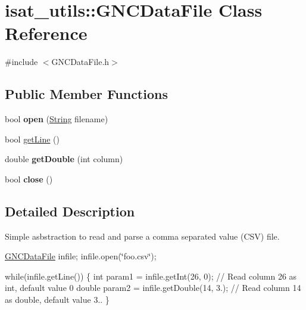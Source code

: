 \hypertarget{classisat__utils_1_1_g_n_c_data_file}{}\section{isat\+\_\+utils\+:\+:G\+N\+C\+Data\+File Class Reference}
\label{classisat__utils_1_1_g_n_c_data_file}


{\ttfamily \#include $<$G\+N\+C\+Data\+File.\+h$>$}

\subsection*{Public Member Functions}
\begin{DoxyCompactItemize}
\item 
bool {\bfseries open} (\hyperlink{classisat__utils_1_1_string}{String} filename)\hypertarget{classisat__utils_1_1_g_n_c_data_file_ae11b406b9dd075b2e2b043b19038569e}{}\label{classisat__utils_1_1_g_n_c_data_file_ae11b406b9dd075b2e2b043b19038569e}

\item 
bool \hyperlink{classisat__utils_1_1_g_n_c_data_file_a6a89eb1aa7ec3874cb8d1570dd590880}{get\+Line} ()
\item 
double {\bfseries get\+Double} (int column)\hypertarget{classisat__utils_1_1_g_n_c_data_file_ab22f80a46bc9cac5f7ba740b58e2eb56}{}\label{classisat__utils_1_1_g_n_c_data_file_ab22f80a46bc9cac5f7ba740b58e2eb56}

\item 
bool {\bfseries close} ()\hypertarget{classisat__utils_1_1_g_n_c_data_file_a4c16d6555f8048eaf78d429daf542cb3}{}\label{classisat__utils_1_1_g_n_c_data_file_a4c16d6555f8048eaf78d429daf542cb3}

\end{DoxyCompactItemize}


\subsection{Detailed Description}
Simple asbstraction to read and parse a comma separated value (C\+SV) file.

\hyperlink{classisat__utils_1_1_g_n_c_data_file}{G\+N\+C\+Data\+File} infile; infile.\+open(\char`\"{}foo.\+csv\char`\"{});

while(infile.\+get\+Line()) \{ int param1 = infile.\+get\+Int(26, 0); // Read column 26 as int, default value 0 double param2 = infile.\+get\+Double(14, 3.); // Read column 14 as double, default value 3.. \}

